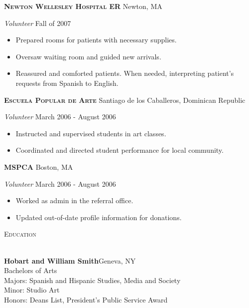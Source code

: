 \documentclass[a4paper]{article}
\newcommand{\lineunder} {
    \vspace*{-8pt} \\
    \hspace*{-18pt} \hrulefill \\
}
\newcommand{\header} [1] {
    {\hspace*{-18pt}\vspace*{6pt} \textsc{#1}}
    \vspace*{-6pt} \lineunder
    \vspace{2mm}
}
\begin{document}
\textbf{\textsc{Newton Wellesley Hospital ER}} \hfill Newton, MA\\
\begin{addmargin}[1em]{0em}
\vspace{2mm}
\textit{Volunteer} \hfill Fall of 2007\\
\vspace{-1mm}
\begin{itemize} \itemsep 1pt
    \item Prepared rooms for patients with necessary supplies.
    \item Oversaw waiting room and guided new arrivals.
    \item Reassured and comforted patients. When needed, interpreting patient’s requests
        from Spanish to English.
\end{itemize}
\end{addmargin}

\textbf{\textsc{Escuela Popular de Arte}} \hfill Santiago de los Caballeros, Dominican Republic\\
\begin{addmargin}[1em]{0em}
\vspace{2mm}
\textit{Volunteer} \hfill March 2006 - August 2006\\
\vspace{-1mm}
\begin{itemize} \itemsep 1pt
    \item Instructed and supervised students in art classes.
    \item Coordinated and directed student performance for local community. 
\end{itemize}
\end{addmargin}

\textbf{\textsc{MSPCA}} \hfill Boston, MA\\
\begin{addmargin}[1em]{0em}
\vspace{2mm}
\textit{Volunteer} \hfill March 2006 - August 2006\\
\vspace{-1mm}
\begin{itemize} \itemsep 1pt
    \item Worked as admin in the referral office.
    \item Updated out-of-date profile information for donations.
\end{itemize}
\end{addmargin}
\vspace*{4mm}


\header{\faGraduationCap \hspace{1pt} Education}
\textbf{Hobart and William Smith}\hfill Geneva, NY\\
Bachelors of Arts \\
Majors: Spanish and Hispanic Studies, Media and Society\\
Minor: Studio Art\\
Honors: Deans List, President’s Public Service Award
\vspace{4mm}
\end{document}
